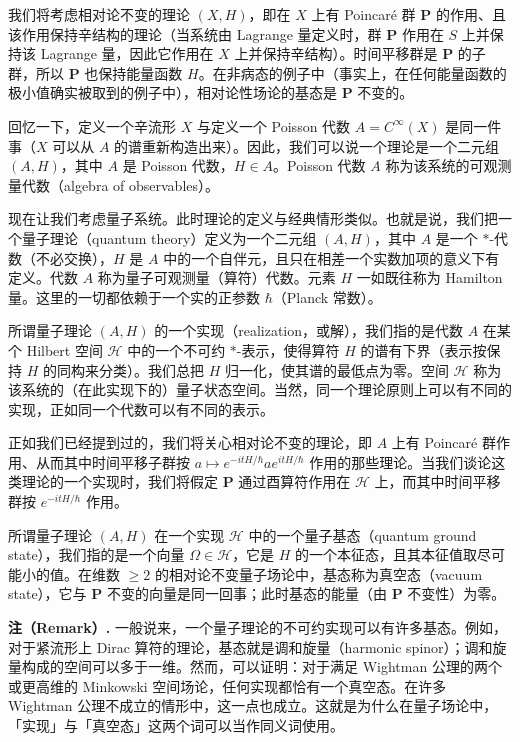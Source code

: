 我们将考虑相对论不变的理论 $(X,H)$，即在 $X$ 上有 Poincaré 群 $\mathbf{P}$ 的作用、且该作用保持辛结构的理论（当系统由 Lagrange 量定义时，群 $\mathbf{P}$ 作用在 $S$ 上并保持该 Lagrange 量，因此它作用在 $X$ 上并保持辛结构）。时间平移群是 $\mathbf{P}$ 的子群，所以 $\mathbf{P}$ 也保持能量函数 $H$。在非病态的例子中（事实上，在任何能量函数的极小值确实被取到的例子中），相对论性场论的基态是 $\mathbf{P}$ 不变的。

回忆一下，定义一个辛流形 $X$ 与定义一个 Poisson 代数 $A=C^\infty(X)$ 是同一件事（$X$ 可以从 $A$ 的谱重新构造出来）。因此，我们可以说一个理论是一个二元组 $(A,H)$，其中 $A$ 是 Poisson 代数，$H\in A$。Poisson 代数 $A$ 称为该系统的可观测量代数（algebra of observables）。

现在让我们考虑量子系统。此时理论的定义与经典情形类似。也就是说，我们把一个量子理论（quantum theory）定义为一个二元组 $(A,H)$，其中 $A$ 是一个 $*$-代数（不必交换），$H$ 是 $A$ 中的一个自伴元，且只在相差一个实数加项的意义下有定义。代数 $A$ 称为量子可观测量（算符）代数。元素 $H$ 一如既往称为 Hamilton 量。这里的一切都依赖于一个实的正参数 $\hbar$（Planck 常数）。

所谓量子理论 $(A,H)$ 的一个实现（realization，或解），我们指的是代数 $A$ 在某个 Hilbert 空间 $\mathcal{H}$ 中的一个不可约 $*$-表示，使得算符 $H$ 的谱有下界（表示按保持 $H$ 的同构来分类）。我们总把 $H$ 归一化，使其谱的最低点为零。空间 $\mathcal{H}$ 称为该系统的（在此实现下的）量子状态空间。当然，同一个理论原则上可以有不同的实现，正如同一个代数可以有不同的表示。

正如我们已经提到过的，我们将关心相对论不变的理论，即 $A$ 上有 Poincaré 群作用、从而其中时间平移子群按 $a\mapsto e^{-itH/\hbar}ae^{itH/\hbar}$ 作用的那些理论。当我们谈论这类理论的一个实现时，我们将假定 $\mathbf{P}$ 通过酉算符作用在 $\mathcal{H}$ 上，而其中时间平移群按 $e^{-itH/\hbar}$ 作用。

所谓量子理论 $(A,H)$ 在一个实现 $\mathcal{H}$ 中的一个量子基态（quantum ground state），我们指的是一个向量 $\Omega\in\mathcal{H}$，它是 $H$ 的一个本征态，且其本征值取尽可能小的值。在维数 $\ge2$ 的相对论不变量子场论中，基态称为真空态（vacuum state），它与 $\mathbf{P}$ 不变的向量是同一回事；此时基态的能量（由 $\mathbf{P}$ 不变性）为零。

\textbf{注（Remark）.}
一般说来，一个量子理论的不可约实现可以有许多基态。例如，对于紧流形上 Dirac 算符的理论，基态就是调和旋量（harmonic spinor）；调和旋量构成的空间可以多于一维。然而，可以证明：对于满足 Wightman 公理的两个或更高维的 Minkowski 空间场论，任何实现都恰有一个真空态。在许多 Wightman 公理不成立的情形中，这一点也成立。这就是为什么在量子场论中，「实现」与「真空态」这两个词可以当作同义词使用。

